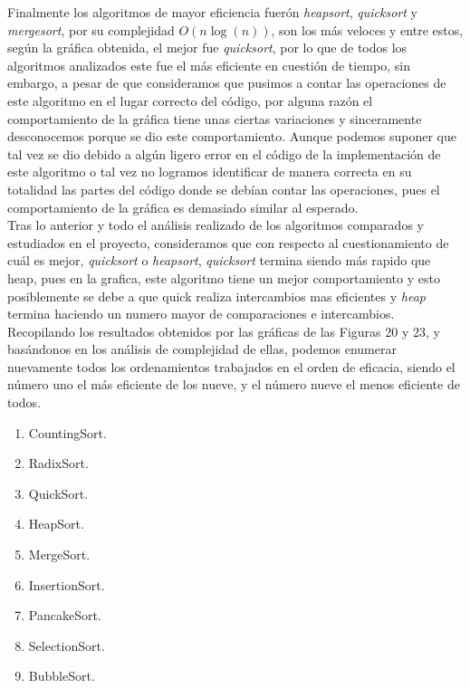\documentclass[a4paper,12pt]{article}
\begin{document}
Finalmente los algoritmos de mayor eficiencia fuerón \textit{heapsort}, \textit{quicksort} y \textit{mergesort}, por su complejidad $O(n\log(n))$, son los más veloces y entre estos, según la gráfica obtenida, el mejor fue \textit{quicksort}, por lo que de todos los algoritmos analizados este fue el más eficiente en cuestión de tiempo, sin embargo, a pesar de que consideramos que pusimos a contar las operaciones de este algoritmo en el lugar correcto del código, por alguna razón el comportamiento de la gráfica tiene unas ciertas variaciones y sinceramente desconocemos porque se dio este comportamiento. Aunque podemos suponer que tal vez se dio debido a algún ligero error en el código de la implementación de este algoritmo o tal vez no logramos identificar de manera correcta en su totalidad las partes del código donde se debían contar las operaciones, pues el comportamiento de la gráfica es demasiado similar al esperado.\\

Tras lo anterior y todo el análisis realizado de los algoritmos comparados y estudiados en el proyecto, consideramos que con respecto al cuestionamiento de cuál es mejor, \textit{quicksort} o \textit{heapsort}, \textit{quicksort} termina siendo más rapido que heap, pues en la grafica, este algoritmo tiene un mejor comportamiento y esto posiblemente se debe a que quick realiza intercambios mas eficientes y \textit{heap} termina haciendo un numero mayor de comparaciones e intercambios.\\

Recopilando los resultados obtenidos por las gráficas de las Figuras 20 y 23, y basándonos en los análisis de complejidad de ellas, podemos enumerar nuevamente todos los ordenamientos trabajados en el orden de eficacia, siendo el número uno el más eficiente de los nueve, y el número nueve el menos eficiente de todos.

\begin{enumerate}
    \item CountingSort.
    \item RadixSort.
    \item QuickSort.
    \item HeapSort.
    \item MergeSort.
    \item InsertionSort.
    \item PancakeSort.
    \item SelectionSort.
    \item BubbleSort.
\end{enumerate}
\end{document}
